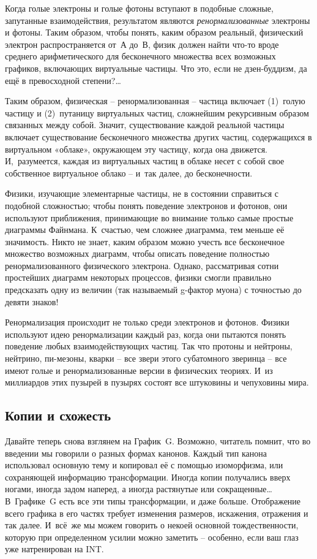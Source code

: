 \documentclass[../main.tex]{subfiles}
\begin{document}
Когда голые электроны и голые фотоны вступают в подобные сложные, запутанные взаимодействия, результатом являются \emph{ренормализованные} электроны и фотоны. Таким образом, чтобы понять, каким образом реальный, физический электрон распространяется от~А до~В, физик должен найти что-то вроде среднего арифметического для бесконечного множества всех возможных графиков, включающих виртуальные частицы. Что это, если не дзен-буддизм, да ещё в превосходной степени?\ldots{}

Таким образом, физическая \--- ренормализованная \--- частица включает (1)~голую частицу и (2)~путаницу виртуальных частиц, сложнейшим рекурсивным образом связанных между собой. Значит, существование каждой реальной частицы включает существование бесконечного множества других частиц, содержащихся в виртуальном «облаке», окружающем эту частицу, когда она движется. И,~разумеется, каждая из виртуальных частиц в облаке несет с собой свое собственное виртуальное облако \--- и~так далее, до бесконечности.

Физики, изучающие элементарные частицы, не в состоянии справиться с подобной сложностью; чтобы понять поведение электронов и фотонов, они используют приближения, принимающие во внимание только самые простые диаграммы Файнмана. К~счастью, чем сложнее диаграмма, тем меньше её значимость. Никто не знает, каким образом можно учесть все бесконечное множество возможных диаграмм, чтобы описать поведение полностью ренормализованного физического электрона. Однако, рассматривая сотни простейших диаграмм некоторых процессов, физики смогли правильно предсказать одну из величин (так называемый g-фактор муона) с точностью до девяти знаков!

Ренормализация происходит не только среди электронов и фотонов. Физики используют идею ренормализации каждый раз, когда они пытаются понять поведение любых взаимодействующих частиц. Так что протоны и нейтроны, нейтрино, пи-мезоны, кварки \--- все звери этого субатомного зверинца \--- все имеют голые и ренормализованные версии в физических теориях. И~из миллиардов этих пузырей в пузырях состоят все штуковины и чепуховины мира.


\subsection{Копии и схожесть}

Давайте теперь снова взглянем на График~G\@. Возможно, читатель помнит, что во введении мы говорили о разных формах канонов. Каждый тип канона использовал основную тему и копировал её с помощью изоморфизма, или сохраняющей информацию трансформации. Иногда копии получались вверх ногами, иногда задом наперед, а иногда растянутые или сокращенные\ldots{} В~Графике~G есть все эти типы трансформации, и даже больше. Отображение всего графика в его частях требует изменения размеров, искажения, отражения и так далее. И~всё~же мы можем говорить о некоей основной тождественности, которую при определенном усилии можно заметить \--- особенно, если ваш глаз уже натренирован на INT\@.
\end{document}
